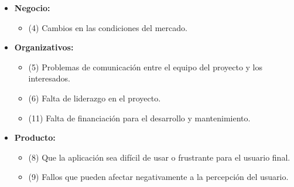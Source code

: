 \begin{solucion}[Solucion (2)]
    \begin{itemize}
        \item \textbf{Negocio:}
        \begin{itemize}
            \item (4) Cambios en las condiciones del mercado.
        \end{itemize}

        \item \textbf{Organizativos:}
        \begin{itemize}
            \item (5) Problemas de comunicación entre el equipo del proyecto y los interesados.
            \item (6) Falta de liderazgo en el proyecto.
            \item (11) Falta de financiación para el desarrollo y mantenimiento.
        \end{itemize}

        \item \textbf{Producto:}
        \begin{itemize}
            \item (8) Que la aplicación sea difícil de usar o frustrante para el usuario final.
            \item (9) Fallos que pueden afectar negativamente a la percepción del usuario.
        \end{itemize}

    \end{itemize}

\end{solucion}